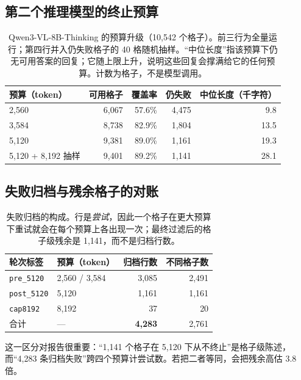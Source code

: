 \subsection*{第二个推理模型的终止预算}

\begin{table}[H]
\centering
\small
\caption{Qwen3-VL-8B-Thinking 的预算升级（10,542 个格子）。前三行为全量运行；第四行并入仍失败格子的 40 格随机抽样。``中位长度''指该预算下仍无可用答案的回复；它随上限上升，说明这些回复会撑满给它的任何预算。计数为格子，不是模型调用。}
\label{tab:r2budget}
\begin{tabular}{lrrrr}
\toprule
预算（token） & 可用格子 & 覆盖率 & 仍失败 & 中位长度（千字符） \\
\midrule
2,560 & 6,067 & 57.6\% & 4,475 & 9.8 \\
3,584 & 8,738 & 82.9\% & 1,804 & 13.5 \\
5,120 & 9,381 & 89.0\% & 1,161 & 19.3 \\
5,120 + 8,192 抽样 & 9,401 & 89.2\% & 1,141 & 28.1 \\
\bottomrule
\end{tabular}
\end{table}

\subsection*{失败归档与残余格子的对账}

\begin{table}[H]
\centering
\small
\caption{失败归档的构成。行是\emph{尝试}，因此一个格子在更大预算下重试就会在每个预算上各出现一次；最终过滤后的格子级残余是 1,141，而不是归档行数。}
\label{tab:r2recon}
\begin{tabular}{llrr}
\toprule
轮次标签 & 预算（token） & 归档行数 & 不同格子数 \\
\midrule
\texttt{pre\_5120} & 2,560 / 3,584 & 3,085 & 2,491 \\
\texttt{post\_5120} & 5,120 & 1,161 & 1,161 \\
\texttt{cap8192} & 8,192 & 37 & 20 \\
\midrule
合计 & --- & \textbf{4,283} & 2,761 \\
\bottomrule
\end{tabular}
\end{table}

这一区分对报告很重要：``1,141 个格子在 5,120 下从不终止''是格子级陈述，而``4,283 条归档失败''跨四个预算计尝试数。若把二者等同，会把残余高估 3.8 倍。

